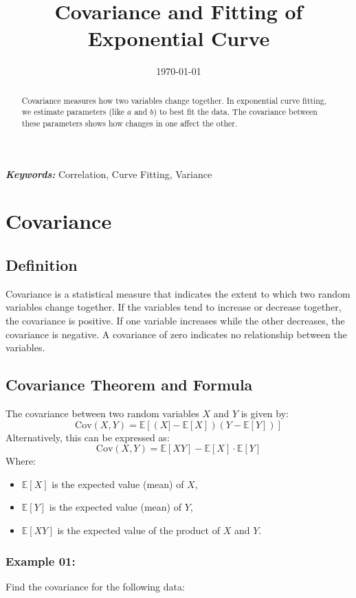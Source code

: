 \documentclass[12pt]{article}
\title{Covariance and Fitting of Exponential Curve}
\date{\today}
\begin{document}
\maketitle

\begin{abstract}
Covariance measures how two variables change together. In exponential curve fitting, we estimate parameters (like \( a \) and \( b \)) to best fit the data. The covariance between these parameters shows how changes in one affect the other. 
\end{abstract}

\providecommand{\keywords}[1]{\textbf{\textit{Keywords:}} #1}
\keywords{Correlation, Curve Fitting, Variance} 

\section*{Covariance}
\subsection*{Definition}
Covariance is a statistical measure that indicates the extent to which two random variables change together. If the variables tend to increase or decrease together, the covariance is positive. If one variable increases while the other decreases, the covariance is negative. A covariance of zero indicates no relationship between the variables.
\subsection*{Covariance Theorem and Formula}

The covariance between two random variables \( X \) and \( Y \) is given by:
\[
\text{Cov}(X, Y) = \mathbb{E}[(X] - \mathbb{E}[X])(Y - \mathbb{E}[Y])]
\]
Alternatively, this can be expressed as:
\[
\text{Cov}(X, Y) = \mathbb{E}[XY] - \mathbb{E}[X] \cdot \mathbb{E}[Y]
\]
Where:
\begin{itemize}
    \item \( \mathbb{E}[X] \) is the expected value (mean) of \( X \),
    \item \( \mathbb{E}[Y] \) is the expected value (mean) of \( Y \),
    \item \( \mathbb{E}[XY] \) is the expected value of the product of \( X \) and \( Y \).
\end{itemize}

\subsubsection*{\hspace{0.5cm}Example 01:}
     Find the covariance for the following data: 
\end{document}
